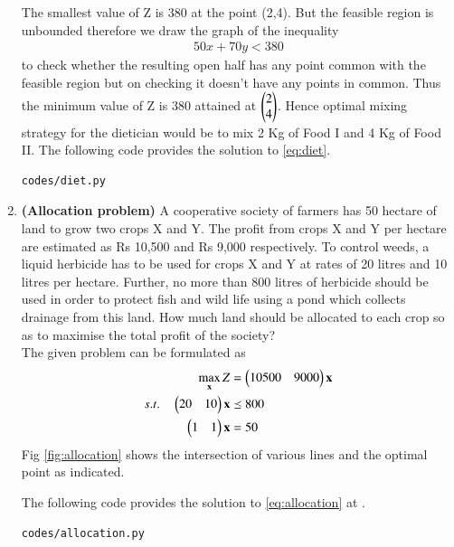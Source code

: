 \begin{enumerate}[label=\arabic*.,ref=\thesection.\theenumi]
The smallest value of Z is 380 at the point (2,4). But the feasible region is unbounded therefore we draw the graph of the inequality
\begin{align}
50x +70y<380
\end{align}
to check whether the resulting open half has any point common with the feasible region but on checking it doesn't have any points in common. 
Thus the minimum value of Z is 380 attained at $\begin{pmatrix}2\\4\end{pmatrix}$. Hence optimal mixing strategy for the dietician would be to mix 2 Kg of Food I and 4 Kg of Food II.  The following code provides the solution to \eqref{eq:diet}.
%
\begin{lstlisting}
codes/diet.py
\end{lstlisting}



\item \textbf{(Allocation problem)} A cooperative society of farmers has 50 hectare
of land to grow two crops X and Y. The profit from crops X and Y per hectare are
estimated as Rs 10,500 and Rs 9,000 respectively. To control weeds, a liquid herbicide
has to be used for crops X and Y at rates of 20 litres and 10 litres per hectare. Further,
no more than 800 litres of herbicide should be used in order to protect fish and wild life
using a pond which collects drainage from this land. How much land should be allocated
to each crop so as to maximise the total profit of the society?\\
\solution The given problem can be formulated as
\begin{align}
\max_{\mathbf{x}} Z &= \begin{pmatrix}10500 & 9000\end{pmatrix}\mathbf{x}
\\
s.t. \quad 
\begin{pmatrix}
20 & 10
\end{pmatrix}
\mathbf{x} & \preceq 800
\\
\begin{pmatrix}
1 & 1
\end{pmatrix} 
\mathbf{x} &= 50
\label{eq:allocation}
\end{align}
Fig  \ref{fig:allocation}
shows the intersection of various lines and the optimal point as indicated.

The following code provides the solution to \eqref{eq:allocation} at .
%
\begin{lstlisting}
codes/allocation.py
\end{lstlisting}


\end{enumerate}
